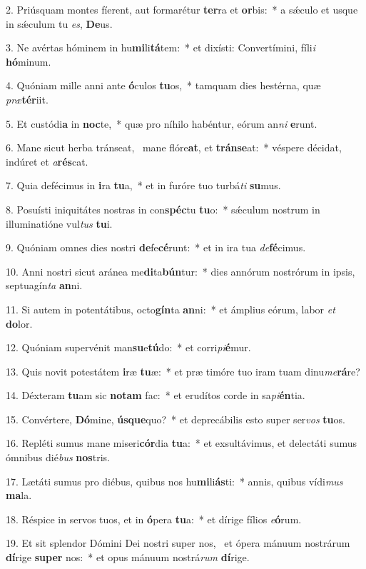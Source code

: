 2. Priúsquam montes fíerent, aut formarétur \textbf{ter}ra et \textbf{or}bis:~*  a sǽculo et usque in sǽculum tu \textit{es}, \textbf{De}us.\

3. Ne avértas hóminem in hu\textbf{mi}li\textbf{tá}tem:~*  et dixísti: Convertímini, fíli\textit{i} \textbf{hó}minum.\

4. Quóniam mille anni ante \textbf{ó}culos \textbf{tu}os,~*  tamquam dies hestérna, quæ \textit{præ}\textbf{tér}iit.\

5. Et custódi\textbf{a} in \textbf{noc}te,~*  quæ pro níhilo habéntur, eórum an\textit{ni} \textbf{e}runt.\

6. Mane sicut herba tránseat, \dag\  mane flóre\textbf{at}, et \textbf{tráns}\textbf{e}at:~*  véspere décidat, indúret et \textit{a}\textbf{rés}cat.\

7. Quia defécimus in \textbf{i}ra \textbf{tu}a,~*  et in furóre tuo turbá\textit{ti} \textbf{su}mus.\

8. Posuísti iniquitátes nostras in con\textbf{spéc}tu \textbf{tu}o:~*  sǽculum nostrum in illuminatióne vul\textit{tus} \textbf{tu}i.\

9. Quóniam omnes dies nostri \textbf{de}fe\textbf{cé}runt:~*  et in ira tua \textit{de}\textbf{fé}cimus.\

10. Anni nostri sicut aránea me\textbf{di}ta\textbf{bún}tur:~*  dies annórum nostrórum in ipsis, septuagín\textit{ta} \textbf{an}ni.\

11. Si autem in potentátibus, octo\textbf{gín}ta \textbf{an}ni:~*  et ámplius eórum, labor \textit{et} \textbf{do}lor.\

12. Quóniam supervénit man\textbf{su}e\textbf{tú}do:~*  et corri\textit{pi}\textbf{é}mur.\

13. Quis novit potestátem \textbf{i}ræ \textbf{tu}æ:~*  et præ timóre tuo iram tuam dinu\textit{me}\textbf{rá}re?\

14. Déxteram \textbf{tu}am sic \textbf{no}\textbf{tam} fac:~*  et erudítos corde in sa\textit{pi}\textbf{én}tia.\

15. Convértere, \textbf{Dó}mine, \textbf{ús}\textbf{que}quo?~*  et deprecábilis esto super ser\textit{vos} \textbf{tu}os.\

16. Repléti sumus mane miseri\textbf{cór}dia \textbf{tu}a:~*  et exsultávimus, et delectáti sumus ómnibus dié\textit{bus} \textbf{nos}tris.\

17. Lætáti sumus pro diébus, quibus nos hu\textbf{mi}li\textbf{ás}ti:~*  annis, quibus vídi\textit{mus} \textbf{ma}la.\

18. Réspice in servos tuos, et in \textbf{ó}pera \textbf{tu}a:~*  et dírige fílios \textit{e}\textbf{ó}rum.\

19. Et sit splendor Dómini Dei nostri super nos, \dag\  et ópera mánuum nostrárum \textbf{dí}rige \textbf{su}\textbf{per} nos:~*  et opus mánuum nostrá\textit{rum} \textbf{dí}rige.\

